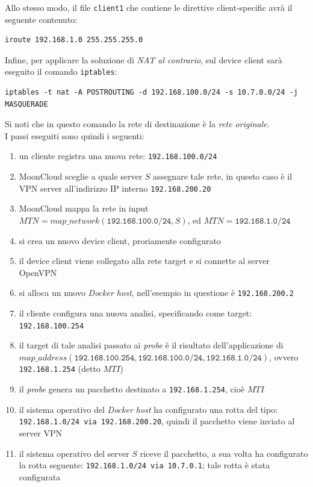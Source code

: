 Allo stesso modo, il file \texttt{client1} che contiene le direttive client-specific
avrà il seguente contenuto:
\begin{verbatim}
iroute 192.168.1.0 255.255.255.0
\end{verbatim}
Infine, per applicare la soluzione di \textit{NAT al contrario}, sul device client
sarà eseguito il comando \texttt{iptables}:
\begin{verbatim}
iptables -t nat -A POSTROUTING -d 192.168.100.0/24 -s 10.7.0.0/24 -j MASQUERADE
\end{verbatim}
Si noti che in questo comando la rete di destinazione è la \textit{rete originale}.\\
 I passi eseguiti sono quindi i seguenti:
\begin{enumerate}
  \item un cliente registra una nuova rete: \texttt{192.168.100.0/24}
  \item MoonCloud sceglie a quale server $S$ assegnare tale rete,
  in questo caso è il VPN server all'indirizzo IP interno \texttt{192.168.200.20}
  \item MoonCloud mappa la rete in input $MTN=map\_network(\texttt{192.168.100.0/24}, S)$,
  ed $MTN=\texttt{192.168.1.0/24}$
  \item si crea un nuovo device client, proriamente configurato
  \item il device client viene collegato alla rete target e si connette al server OpenVPN
  \item si alloca un nuovo \textit{Docker host}, nell'esempio in questione è \texttt{192.168.200.2}
  \item il cliente configura una nuova analisi, specificando come target: \texttt{192.168.100.254}
  \item il target di tale analisi passato ai \textit{probe} è il risultato dell'applicazione
  di $map\_address(\texttt{192.168.100.254}, \texttt{192.168.100.0/24}, \texttt{192.168.1.0/24})$,
  ovvero \texttt{192.168.1.254} (detto $MTI$)
  \item il \textit{probe} genera un pacchetto destinato a \texttt{192.168.1.254}, cioè $MTI$
  \item il sistema operativo del \textit{Docker host} ha configurato una rotta del tipo:
  \texttt{192.168.1.0/24 via 192.168.200.20}, quindi il pacchetto viene inviato al server VPN
  \item il sistema operativo del server $S$ riceve il pacchetto, a sua volta ha configurato
  la rotta seguente: \texttt{192.168.1.0/24 via 10.7.0.1}; tale rotta è stata configurata

\end{enumerate}
